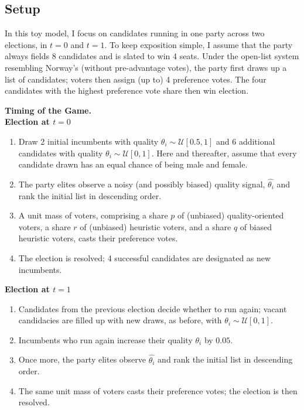 \documentclass[12pt]{article}
\begin{document}
\subsection{Setup}

In this toy model, I focus on candidates running in one party across two elections, in $t = 0$ and $t = 1$. To keep exposition simple, I assume that the party always fields 8 candidates and is slated to win 4 seats. Under the open-list system resembling Norway's (without pre-advantage votes), the party first draws up a list of candidates; voters then assign (up to) 4 preference votes. The four candidates with the highest preference vote share then win election.

\noindent \textbf{Timing of the Game.} \\

\textbf{Election at $t = 0$}

\begin{enumerate}
    \item Draw 2 initial incumbents with quality $\theta_i \sim \mathcal{U}[0.5, 1]$ and 6 additional candidates with quality $\theta_i \sim \mathcal{U}[0, 1]$. Here and thereafter, assume that every candidate drawn has an equal chance of being male and female.
    \item The party elites observe a noisy (and possibly biased) quality signal, $\hat{\theta_i}$ and rank the initial list in descending order.
    \item A unit mass of voters, comprising a share $p$ of (unbiased) quality-oriented voters, a share $r$ of (unbiased) heuristic voters, and a share $q$ of biased heuristic voters, casts their preference votes.
    \item  The election is resolved; 4 successful candidates are designated as new incumbents.
\end{enumerate}

\textbf{Election at $t = 1$}

\begin{enumerate}
    \item Candidates from the previous election decide whether to run again; vacant candidacies are filled up with new draws, as before, with $\theta_i \sim \mathcal{U}[0, 1]$.
    \item Incumbents who run again increase their quality $\theta_i$ by $0.05$.
    \item  Once more, the party elites observe $\hat{\theta_i}$ and rank the initial list in descending order.
    \item  The same unit mass of voters casts their preference votes; the election is then resolved.
\end{enumerate}
\end{document}
